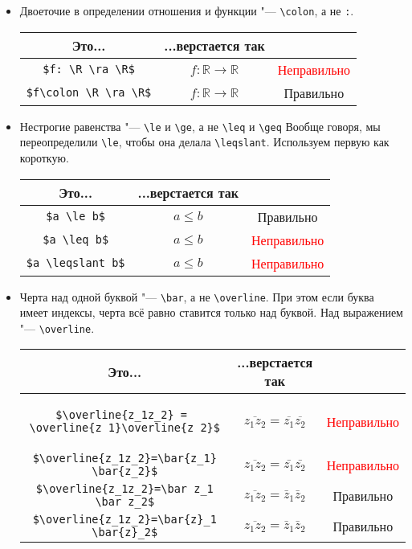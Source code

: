 \documentclass[12pt,a4paper]{book}
\def\ra{\rightarrow}
\def\R{\mathbb{R}}
\renewcommand{\le}{\leqslant}
\renewcommand{\ge}{\geqslant}
\newcommand{\ok}{& \textcolor{green!60!black}{Правильно}}
\newcommand{\bad}{& \textcolor{red}{Неправильно}}
\begin{document}
\begin{enumerate}
\begin{itemize}
	\item 
		Двоеточие в определении отношения и функции "--- \verb'\colon', а не \verb':'.
		\begin{center}\begin{tabular}{|c|c|c|}
			\hline Это... & ...верстается так & \\
			\hline \verb'$f: \R \ra \R$' & $f:\R\ra\R$ \bad \\
			\hline \verb'$f\colon \R \ra \R$' & $f\colon\R\ra\R$ \ok \\
			\hline
		\end{tabular}\end{center}

	\item
		Нестрогие равенства "--- \verb'\le' и \verb'\ge', а не \verb'\leq' и \verb'\geq' 
		Вообще говоря, мы переопределили \verb'\le', чтобы она делала \verb'\leqslant'.
		Используем первую как короткую.
		\begin{center}\begin{tabular}{|c|c|c|}
			\hline Это... & ...верстается так & \\
			\hline \verb'$a \le b$' & $a \le b$ \ok \\
			\hline \verb'$a \leq b$' & $a \leq b$ \bad \\
			\hline \verb'$a \leqslant b$' & $a \leqslant b$ \bad \\
			\hline
		\end{tabular}\end{center}
	
	\item 
		Черта над одной буквой "--- \verb'\bar', а не \verb'\overline'.
		При этом если буква имеет индексы, черта всё равно ставится только над буквой.
		Над выражением "--- \verb'\overline'.
		\begin{center}\begin{tabular}{|c|c|c|}
			\hline Это... & ...верстается так & \\
			\hline
			\begin{minipage}{10cm}
				\begin{verbatim}
$\overline{z_1z_2} = 
\overline{z_1}\overline{z_2}$
\end{verbatim}
			\end{minipage}
			& $\overline{z_1z_2} = \overline{z_1}\overline{z_2}$ \bad \\
			\hline \verb'$\overline{z_1z_2}=\bar{z_1} \bar{z_2}$' & $\overline{z_1z_2} = \bar{z_1} \bar{z_2}$ \bad \\
			\hline \verb'$\overline{z_1z_2}=\bar z_1 \bar z_2$' & $\overline{z_1z_2} = \bar z_1 \bar z_2$ \ok \\
			\hline \verb'$\overline{z_1z_2}=\bar{z}_1 \bar{z}_2$' & $\overline{z_1z_2} = \bar z_1 \bar z_2$ \ok \\
			\hline
		\end{tabular}\end{center}


\end{itemize}
\end{enumerate}
\end{document}
